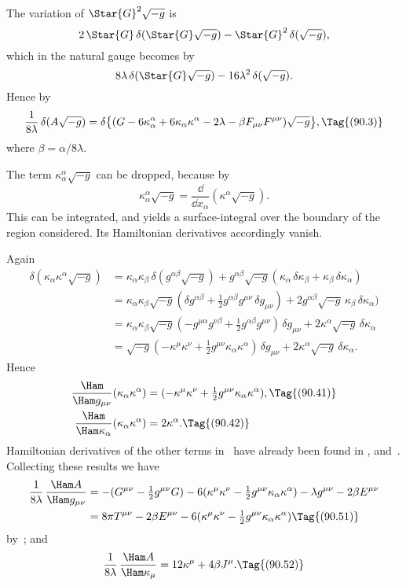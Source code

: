 \documentclass[12pt]{book}
\begin{document}
The variation of $\Star{G}^{2} \sqrt{-g}$ is
\[
2\, \Star{G}\, \delta(\Star{G} \sqrt{-g}) - \Star{G}^{2}\, \delta(\sqrt{-g}),
\]
which in the natural gauge becomes by~
\[
8\lambda\, \delta(\Star{G} \sqrt{-g}) - 16\lambda^2\, \delta(\sqrt{-g}).
\]
Hence by~
\[
\frac{1}{8\lambda}\, \delta(A \sqrt{-g})
= \delta \bigl\{(G - 6\kappa_{\alpha}^{\alpha} + 6\kappa_{\alpha} \kappa^{\alpha} - 2\lambda - \beta F_{\mu\nu} F^{\mu\nu}) \sqrt{-g}\bigr\},
\Tag{(90.3)}
\]
where $\beta = \alpha/8\lambda$.

The term $\kappa_{\alpha}^{\alpha} \sqrt{-g}$ can be dropped, because by~
\[
\kappa_{\alpha}^{\alpha} \sqrt{-g}
= \frac{\dd}{\dd x_{\alpha}} (\kappa^{\alpha} \sqrt{-g}).
\]
This can be integrated, and yields a surface\hyp{}integral over the boundary of the
region considered. Its Hamiltonian derivatives accordingly vanish.

Again
\begin{align*}
  \delta (\kappa_{\alpha} \kappa^{\alpha} \sqrt{-g})
  &= \kappa_{\alpha} \kappa_{\beta}\, \delta(g^{\alpha\beta} \sqrt{-g})
  + g^{\alpha\beta} \sqrt{-g} (\kappa_{\alpha}\, \delta\kappa_{\beta} + \kappa_{\beta}\, \delta\kappa_{\alpha}) \\
  &= \kappa_{\alpha} \kappa_{\beta} \sqrt{-g} (\delta g^{\alpha\beta} + \tfrac{1}{2} g^{\alpha\beta} g^{\mu\nu}\, \delta g_{\mu\nu})
  + 2g^{\alpha\beta} \sqrt{-g}\, \kappa_{\beta}\, \delta\kappa_{\alpha}) \\
  &= \kappa_{\alpha} \kappa_{\beta} \sqrt{-g} (-g^{\mu\alpha} g^{\nu\beta} + \tfrac{1}{2} g^{\alpha\beta} g^{\mu\nu})\, \delta g_{\mu\nu}
  + 2\kappa^{\alpha} \sqrt{-g}\, \delta\kappa_{\alpha} \\
  &= \sqrt{-g} (-\kappa^{\mu} \kappa^{\nu} + \tfrac{1}{2} g^{\mu\nu} \kappa_{\alpha} \kappa^{\alpha})\, \delta g_{\mu\nu}
  + 2\kappa^{\alpha} \sqrt{-g}\, \delta\kappa_{\alpha}.
\end{align*}
Hence
\begin{align*}
  \frac{\Ham}{\Ham g_{\mu\nu}} (\kappa_{\alpha} \kappa^{\alpha})
  &= (-\kappa^{\mu} \kappa^{\nu} + \tfrac{1}{2} g^{\mu\nu} \kappa_{\alpha} \kappa^{\alpha}),
  \Tag{(90.41)} \\
  \frac{\Ham}{\Ham \kappa_{\alpha}} (\kappa_{\alpha} \kappa^{\alpha})
  &= 2\kappa^{\alpha}.
  \Tag{(90.42)}
\end{align*}
Hamiltonian derivatives of the other terms in~ have already been found
in ,  and~. Collecting these results we have
\begin{align*}
  \frac{1}{8\lambda}\, \frac{\Ham A}{\Ham g_{\mu\nu}}
  &= -(G^{\mu\nu} - \tfrac{1}{2} g^{\mu\nu} G)
  - 6(\kappa^{\mu} \kappa^{\nu} - \tfrac{1}{2} g^{\mu\nu} \kappa_{\alpha} \kappa^{\alpha})
  - \lambda g^{\mu\nu} - 2\beta E^{\mu\nu} \\
  &= 8\pi T^{\mu\nu} - 2\beta E^{\mu\nu} - 6(\kappa^{\mu} \kappa^{\nu} - \tfrac{1}{2} g^{\mu\nu} \kappa_{\alpha} \kappa^{\alpha})
  \Tag{(90.51)}
\end{align*}
by~; and
\[
\frac{1}{8\lambda}\, \frac{\Ham A}{\Ham \kappa_{\mu}}
= 12\kappa^{\mu} + 4\beta J^{\mu}.
\Tag{(90.52)}
\]
\end{document}
